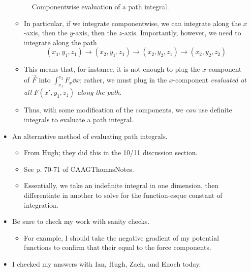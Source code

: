 \documentclass[../notes.tex]{subfiles}
\begin{document}
\begin{itemize}
\begin{figure}[h!]
        \caption{Componentwise evaluation of a path integral.}
        \label{fig:pathIntComponent}
    \end{figure}
    \begin{itemize}
        \item In particular, if we integrate componentwise, we can integrate along the $x$-axis, then the $y$-axis, then the $z$-axis. Importantly, however, we need to integrate along the path
        \begin{equation*}
            (x_1,y_1,z_1) \to (x_2,y_1,z_1) \to (x_2,y_2,z_1) \to (x_2,y_2,z_2)
        \end{equation*}
        \item This means that, for instance, it is not enough to plug the $x$-component of $\vec{F}$ into $\int_{x_1}^{x_2}F_x\dd{x}$; rather, we must plug in the $x$-component \emph{evaluated at all $F(x',y_1,z_1)$ along the path}.
        \item Thus, with some modification of the components, we \emph{can} use definite integrals to evaluate a path integral.
    \end{itemize}
    \item An alternative method of evaluating path integrals.
    \begin{itemize}
        \item From Hugh; they did this in the 10/11 discussion section.
        \item See p. 70-71 of CAAGThomasNotes.
        \item Essentially, we take an indefinite integral in one dimension, then differentiate in another to solve for the function-esque constant of integration.
    \end{itemize}
    \item Be sure to check my work with sanity checks.
    \begin{itemize}
        \item For example, I should take the negative gradient of my potential functions to confirm that their equal to the force components.
    \end{itemize}
    \item I checked my answers with Ian, Hugh, Zach, and Enoch today.
\end{itemize}
\end{document}
